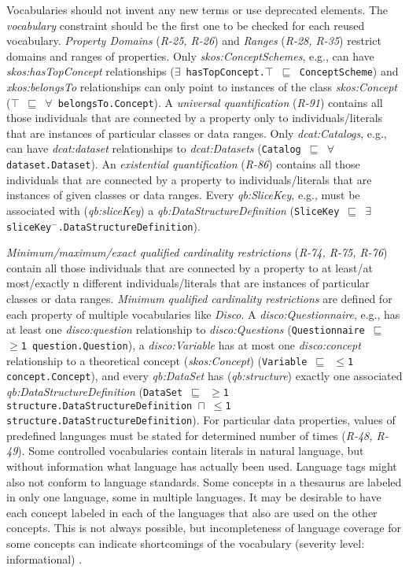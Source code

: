 \documentclass{llncs}
\newcommand{\ms}[1]{\texttt{#1}}
\begin{document}
{{Vocabularies should not invent any new terms or use deprecated elements.
The \emph{vocabulary} constraint should be the first one to be checked for each reused vocabulary.
\emph{Property Domains} (\emph{R-25, R-26}) and \emph{Ranges} (\emph{R-28, R-35}) restrict domains and ranges of properties.
Only \emph{skos:ConceptSchemes}, e.g., can have \emph{skos:hasTopConcept} relationships (\ms{$\exists$ hasTopConcept.$\top$ $\sqsubseteq$ ConceptScheme}) and
\emph{xkos:belongsTo} relationships can only point to instances of the class \emph{skos:Concept} (\ms{$\top$ $\sqsubseteq$ $\forall$ belongsTo.Concept}).
A \emph{universal quantification} (\emph{R-91}) contains all those individuals that are connected by a property only to individuals/literals that are instances of particular classes  or data ranges.
Only \emph{dcat:Catalogs}, e.g., can have \emph{dcat:dataset} relationships to \emph{dcat:Datasets} (\ms{Catalog $\sqsubseteq$ $\forall$ dataset.Dataset}).
An \emph{existential quantification} (\emph{R-86}) contains all those individuals that are connected by a property to individuals/literals that are instances of given classes or data ranges.
Every \emph{qb:SliceKey}, e.g., must be associated with (\emph{qb:sliceKey}) a \emph{qb:DataStructureDefinition} (\ms{SliceKey $\sqsubseteq$ $\exists$ sliceKey$^{-}$.DataStructureDefinition}).

\emph{Minimum/maximum/exact qualified cardinality restrictions} (\emph{R-74, R-75, R-76}) contain all those individuals that are connected by a property to at least/at most/exactly n different individuals/literals that are instances of particular classes or data ranges.
\emph{Minimum qualified cardinality restrictions} are defined for each property of multiple vocabularies like \emph{Disco}.
A \emph{disco:Questionnaire}, e.g., has at least one \emph{disco:question} relationship to \emph{disco:Questions} (\ms{Questionnaire $\sqsubseteq$ $\geq$1 question.Question}),
a \emph{disco:Variable} has at most one \emph{disco:concept} relationship to a theoretical concept (\emph{skos:Concept}) (\ms{Variable $\sqsubseteq$ $\leq$1 concept.Concept}), and every \emph{qb:DataSet} has (\emph{qb:structure}) exactly one associated \emph{qb:DataStructureDefinition} (\ms{DataSet $\sqsubseteq$ $\geq$1 structure.DataStructureDefinition $\sqcap$ $\leq$1 structure.DataStructureDefinition}).
For particular data properties, values of predefined languages must be stated for determined number of times (\emph{R-48, R-49}).
Some controlled vocabularies contain literals in natural language, but without information what language has actually been used. Language tags might also not conform to language standards. 
Some concepts in a thesaurus are labeled in only one language, some in multiple languages. It may be desirable to have each concept labeled in each of the languages that also are used on the other concepts. This is not always possible, but incompleteness of language coverage for some concepts can indicate shortcomings of the vocabulary
(severity level: informational) \cite{MaderHaslhoferIsaac2012}.

}}
\end{document}
